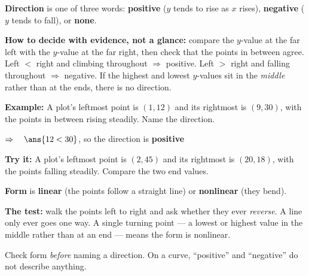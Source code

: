 \documentclass[12pt]{article}
\begin{document}


\begin{formulabox}
\textbf{Direction} is one of three words: \textbf{positive} ($y$ tends to rise as $x$
rises), \textbf{negative} ($y$ tends to fall), or \textbf{none}.\par
\smallskip
\textbf{How to decide with evidence, not a glance:} compare the $y$-value at the far left
with the $y$-value at the far right, then check that the points in between agree.
Left $<$ right and climbing throughout $\Rightarrow$ positive. Left $>$ right and falling
throughout $\Rightarrow$ negative. If the highest and lowest $y$-values sit in the
\emph{middle} rather than at the ends, there is no direction.
\end{formulabox}

\begin{examplebox}
\textbf{Example:} \quad A plot's leftmost point is $(1, 12)$ and its rightmost is
$(9, 30)$, with the points in between rising steadily. Name the direction.

$\Rightarrow\quad \ans{12 < 30}$, so the direction is \textbf{positive}
\end{examplebox}

\begin{tryitbox}
\textbf{Try it:} \quad A plot's leftmost point is $(2, 45)$ and its rightmost is
$(20, 18)$, with the points falling steadily. Compare the two end values.\\[2pt]
\end{tryitbox}


\begin{formulabox}
\textbf{Form} is \textbf{linear} (the points follow a straight line) or \textbf{nonlinear}
(they bend).\par
\smallskip
\textbf{The test:} walk the points left to right and ask whether they ever \emph{reverse}.
A line only ever goes one way. A single turning point --- a lowest or highest value in the
middle rather than at an end --- means the form is nonlinear.\par
\smallskip
Check form \emph{before} naming a direction. On a curve, ``positive'' and ``negative'' do
not describe anything.
\end{formulabox}
\end{document}
